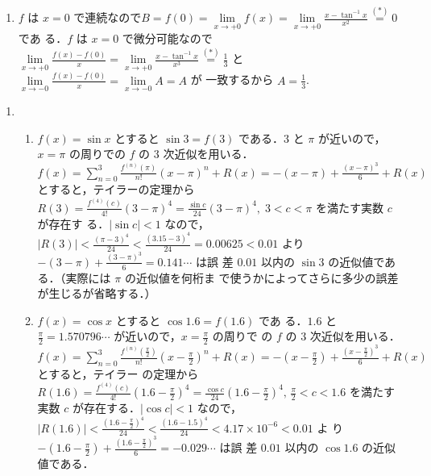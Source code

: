 \documentclass[11pt, uplatex, dvipdfmx, twoside]{jsarticle}
\newcommand{\ds}{\displaystyle}
\renewcommand{\dlim}{\lim\limits} %
\begin{document}
\begin{enumerate}[label=\ref{sec:hospital}.\arabic*]
\begin{enumerate}[label=(\arabic*)]
  \item $f$ は $x=0$
    で連続なので$B=f(0) = \dlim_{x \to +0} f(x) = \dlim_{x \to +0}
    \frac{x-\tan^{-1}x}{x^2} \overset{(\ast)}{=} 0$ であ
    る．$f$ は $x=0$
    で微分可能なので$\dlim_{x \to +0}\frac{f(x)-f(0)}{x} = \dlim_{x
      \to +0} \frac{x-\tan^{-1}x}{x^3} \overset{(\ast)}{=} \frac{1}{3}$
    と$\dlim_{x \to -0} \frac{f(x)-f(0)}{x} = \dlim_{x \to -0} A=A$ が
    一致するから $A=\frac{1}{3}$.
    
  \end{enumerate}
\end{enumerate}

\newpage

\begin{enumerate}[label=\ref{sec:taylor}.\arabic*]
  \setlength{\itemsep}{1ex}
  
\item
  \begin{enumerate}[label=(\arabic*)]

    \setlength{\itemsep}{1ex}
    
  \item $f(x) = \sin x$ とすると $\sin 3 = f(3)$ である．$3$ と $\pi$
    が近いので，$x=\pi$ の周りでの $f$ の $3$
    次近似を用いる．$f(x) = {\ds \sum_{n=0}^{3}}
    \frac{f^{(n)}(\pi)}{n!} (x-\pi)^n +R(x)= -(x-\pi) +
    \frac{(x-\pi)^3}{6} + R(x)$ とすると，テイラーの定理から
    $R(3) = \frac{f^{(4)}(c)}{4!}(3-\pi)^4 = \frac{\sin
      c}{24}(3-\pi)^4, \; 3 < c < \pi$ を満たす実数 $c$ が存在す
    る．$|\sin c| <1$
    なので，$|R(3)| < \frac{(\pi-3)^4}{24}<
    \frac{(3.15-3)^4}{24}=0.00625 < 0.01$
    より $-(3-\pi) + \frac{(3-\pi)^3}{6} = 0.141\cdots$ は誤
    差 $0.01$ 以内の $\sin 3$ の近似値である．（実際には $\pi$ の近似値を何桁ま
    で使うかによってさらに多少の誤差が生じるが省略する．）

  \item $f(x) = \cos x$ とすると $\cos 1.6 = f(1.6)$ であ
    る．$1.6$ と $\frac{\pi}{2}=1.570796\cdots $ が近いので，$x=\frac{\pi}{2}$ の周りで
    の $f$ の $3$
    次近似を用いる．$f(x) = {\ds \sum_{n=0}^{3}}
    \frac{f^{(n)}\left(\frac{\pi}{2}\right)}{n!}\left(x-\frac{\pi}{2}\right)^n + R(x) =
    -\left(x-\frac{\pi}{2}\right) +
    \frac{\left(x-\frac{\pi}{2}\right)^3}{6} + R(x)$ とすると，テイラー
    の定理から
    $R(1.6) = \frac{f^{(4)}(c)}{4!}\left(1.6-\frac{\pi}{2}\right)^4 =
    \frac{ \cos c}{24}\left( 1.6-\frac{\pi}{2}\right)^4 , \,
    \frac{\pi}{2} < c < 1.6$ を満たす実数 $c$ が存在する．$|\cos c|
    <1$
    なので，$|R(1.6)| < \frac{\left(1.6 - \frac{\pi}{2}\right)^4}{24}
    < \frac{(1.6-1.5)^4}{24} < 4.17 \times 10^{-6} < 0.01$ よ
    り $-\left(1.6-\frac{\pi}{2}\right) +
    \frac{\left(1.6-\frac{\pi}{2}\right)^3}{6} =-0.029\cdots$ は誤
    差 $0.01$ 以内の $\cos 1.6$ の近似値である．


\end{enumerate}
\end{enumerate}
\end{document}
